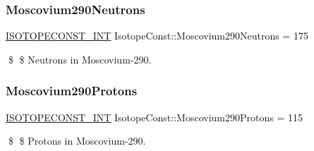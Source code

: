 \subsubsection{\texorpdfstring{Moscovium290\+Neutrons}{Moscovium290Neutrons}}
{\footnotesize\ttfamily \mbox{\hyperlink{group___isotope_const-_macros_ga5f18360b3e99483a35c32d789e62621c}{I\+S\+O\+T\+O\+P\+E\+C\+O\+N\+S\+T\+\_\+\+I\+NT}} Isotope\+Const\+::\+Moscovium290\+Neutrons = 175}

\$ \$ Neutrons in Moscovium-\/290. \mbox{\label{group___isotope_const-_moscovium-_mc290_ga84b69ed8026d2142a5d7437b5df6a3a4}} 
\subsubsection{\texorpdfstring{Moscovium290\+Protons}{Moscovium290Protons}}
{\footnotesize\ttfamily \mbox{\hyperlink{group___isotope_const-_macros_ga5f18360b3e99483a35c32d789e62621c}{I\+S\+O\+T\+O\+P\+E\+C\+O\+N\+S\+T\+\_\+\+I\+NT}} Isotope\+Const\+::\+Moscovium290\+Protons = 115}

\$ \$ Protons in Moscovium-\/290. 